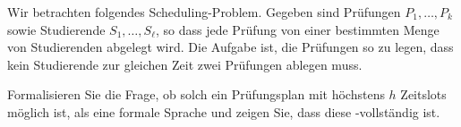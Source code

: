 \documentclass[german]{latteachCD}[2017/03/28]
\begin{document}
\begin{exercise}
  Wir betrachten folgendes Scheduling-Problem.  Gegeben sind Prüfungen $P_{1},
  \ldots, P_{k}$ sowie Studierende $S_{1}, \ldots, S_{\ell}$, so dass jede
  Prüfung von einer bestimmten Menge von Studierenden abgelegt wird.  Die
  Aufgabe ist, die Prüfungen so zu legen, dass kein Studierende zur gleichen
  Zeit zwei Prüfungen ablegen muss.

  Formalisieren Sie die Frage, ob solch ein Prüfungsplan mit höchstens $h$
  Zeitslots möglich ist, als eine formale Sprache und zeigen Sie, dass diese
  \NP-vollständig ist.
\end{exercise}

\begin{exercise}
\end{exercise}
\end{document}
